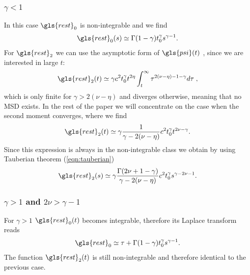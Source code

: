\subsubsection{$\gamma<1 $ }
In this case $\gls{rest}_0$ is non-integrable and we find
\begin{equation}
  \gls{rest}_0(s) \simeq  \Gamma(1-\gamma) t_0^\gamma s^{\gamma-1}.
\end{equation}
For $\gls{rest}_2$  we can use the asymptotic form of $\gls{psi}(t)$ , since we are interested in large $t$:
\begin{equation}
\gls{rest}_2(t) \simeq \gamma c^2 t_0^\gamma t^{2\eta} \int_t^\infty \tau^{2(\nu-\eta)-1-\gamma}  d\tau   \; , 
\end{equation}
which is only finite for $\gamma > 2(\nu-\eta)$ and diverges otherwise, meaning that no MSD exists. In the rest of 
the paper we will concentrate on the case when the second moment converges, where we find
\begin{equation}
\gls{rest}_{2}(t)  \simeq \gamma\frac{1} {\gamma - 2(\nu-\eta)} c^2 t_0^\gamma t^{2\nu -\gamma}  .
\end{equation}
Since this expression is always in the non-integrable class we obtain by using Tauberian theorem (\ref{eqn:tauberian})
\begin{equation}
\gls{rest}_2(s) \simeq \gamma  \frac{ \Gamma(2\nu+1-\gamma)}{\gamma - 2(\nu-\eta)}c^2 t_0^\gamma s^{\gamma - 2\nu-1}.
\end{equation}

\subsubsection{$\gamma>1$ and $2\nu>\gamma-1$}
For $\gamma>1$ $\gls{rest}_0(t)$ becomes integrable, therefore its Laplace transform reads
\begin{equation}
 \gls{rest}_0 \simeq \tau + \Gamma(1-\gamma) t_0^\gamma s^{\gamma-1} .
\end{equation}
The function $\gls{rest}_2(t)$ is still non-integrable and therefore identical to the previous case.

